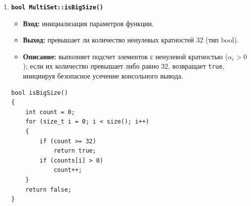 \documentclass[14pt, a4paper]{extarticle}
\begin{document}
\begin{enumerate}[label=\arabic*.]
		\item \textbf{\texttt{bool MultiSet::isBigSize()}}
		\begin{itemize}[leftmargin=*, noitemsep]
			\item \textbf{Вход:} инициализация параметров функции.
			\item \textbf{Выход:} превышает ли количество ненулевых кратностей 32 (тип bool).
			\item \textbf{Описание:} выполняет подсчет элементов с ненулевой кратностью ($\alpha_i > 0$); если их количество превышает либо равно 32, возвращает \texttt{true}, инициируя безопасное усечение консольного вывода.
		\end{itemize}
		\begin{lstlisting}[caption={Метод MultiSet::isBigSize()}, label={lst:multiset_isbigsize}]
bool isBigSize()
{
    int count = 0;
    for (size_t i = 0; i < size(); i++)
    {
        if (count >= 32)
            return true;
        if (counts[i] > 0)
            count++;
    }
    return false;
}
		\end{lstlisting}
	\end{enumerate}
	
\end{document}

